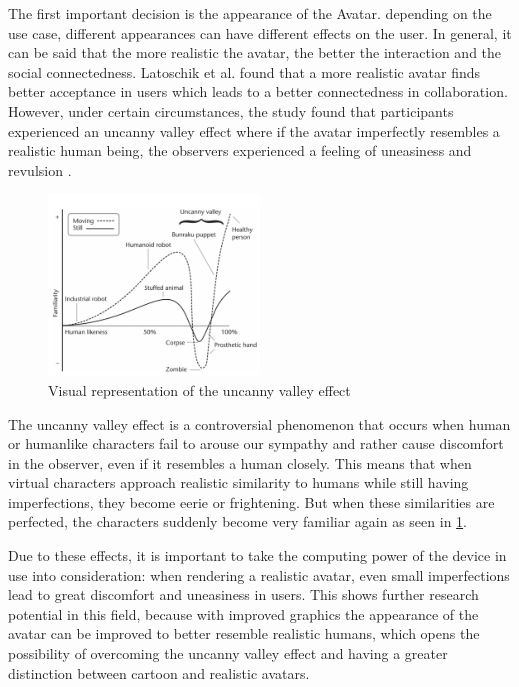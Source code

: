 The first important decision is the appearance of the Avatar. depending on the use case, different appearances can have different effects on the user. In general, it can be said that the more realistic the avatar, the better the interaction and the social connectedness. Latoschik et al. \cite{avatarRealism} found that a more realistic avatar finds better acceptance in users which leads to a better connectedness in collaboration. However, under certain circumstances, the study found that participants experienced an uncanny valley effect where if the avatar imperfectly resembles a realistic human being, the observers experienced a feeling of uneasiness and revulsion \cite{8797719}. 

\begin{figure}[H]
\centering
\includegraphics[width = 0.5\textwidth]{figures/uncannyValley}
\caption[Study 1 setup]{Visual representation of the uncanny valley effect}
\label{fig::uncannyValley}
\end{figure}

The uncanny valley effect is a controversial phenomenon that occurs when human or humanlike characters fail to arouse our sympathy and rather cause discomfort in the observer, even if it resembles a human closely. This means that when virtual characters approach realistic similarity to humans while still having imperfections, they become eerie or frightening. But when these similarities are perfected, the characters suddenly become very familiar again as seen in \ref{fig::uncannyValley}. \cite{4557950}

Due to these effects, it is important to take the computing power of the device in use into consideration: when rendering a realistic avatar, even small imperfections lead to great discomfort and uneasiness in users. This shows further research potential in this field, because with improved graphics the appearance of the avatar can be improved to better resemble realistic humans, which opens the possibility of overcoming the uncanny valley effect and having a greater distinction between cartoon and realistic avatars.

